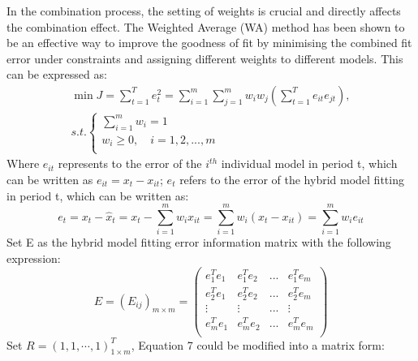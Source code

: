 \documentclass[a4paper]{report}
\begin{document}
\begin{linenumbers}
        In the combination process, the setting of weights is crucial and directly affects the combination effect. The Weighted Average (WA) method has been shown to be an effective way to improve the goodness of fit by minimising the combined fit error under constraints and assigning different weights to different models. This can be expressed as:
        \begin{equation}
            \begin{split}
            \min J=\sum_{t=1}^T{e_{t}^{2}}=\sum_{i=1}^m{\sum_{j=1}^m{w_i}}w_j\left( \sum_{t=1}^T{e_{it}}e_{jt} \right),
            \\
            s.t.\left\{ \begin{array}{l}
            \sum_{i=1}^m{w_i}=1\\
            w_i\geq 0,\quad i=1,2,...,m\\
            \end{array} \right.
            \end{split}
            \label{Weigh vector}
        \end{equation}
        Where $e_{it}$ represents to the error of the $i^{th}$ individual model in period t, which can be written as $e_{it}=x_t-x_{it}$; $e_t$ refers to the error of the hybrid model fitting in period t, which can be written as:
        \begin{equation}
                e_t=x_t-\hat{x}_t=x_t-\sum_{i=1}^m{w_i}x_{it}=\sum_{i=1}^m{w_i}\left( x_t-x_{it} \right) =\sum_{i=1}^m{w_i}e_{it}
                \label{eq:errors}
        \end{equation}
        Set E as the hybrid model fitting error information matrix with the following expression:
        \begin{equation}
            E=\left( E_{ij} \right) _{m\times m}=\left( \begin{matrix}
            e_{1}^{T}e_1&     e_{1}^{T}e_2&     ...&       e_{1}^{T}e_m\\
            e_{2}^{T}e_1&     e_{2}^{T}e_2&     ...&       e_{2}^{T}e_m\\
            \vdots&       \vdots&       ...&      \vdots\\
            e_{m}^{T}e_1&    e_{m}^{T}e_2&    ...&       e_{m}^{T}e_m\\
            \end{matrix} \right)
            \label{error_infro_matrix}
        \end{equation}
        Set $R=\left( 1,1,\cdots ,1 \right) _{1\times m}^T$, Equation 7 could be modified into a matrix form:

\end{linenumbers}
\end{document}
